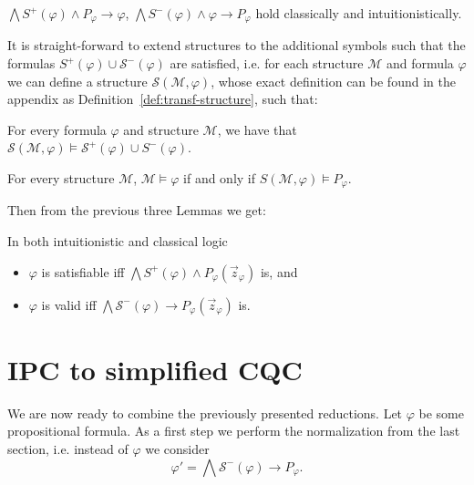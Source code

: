 \documentclass[a4paper,UKenglish,cleveref, autoref, thm-restate]{lipics-v2021}
\begin{document}
\begin{lemma}
	$\bigwedge S^+(\varphi)\wedge P_\varphi\to\varphi$, $\bigwedge S^-(\varphi)\wedge \varphi\to P_\varphi$ hold classically and intuitionistically.
\end{lemma}

It is straight-forward to extend structures to the additional symbols such that the formulas $S^+(\varphi)\cup\mathcal S^-(\varphi)$ are satisfied, i.e. for each structure $\mathcal M$ and formula $\varphi$ we can define a structure $\mathcal S(\mathcal M, \varphi)$, whose exact definition can be found in the appendix as Definition~\ref{def:transf-structure}, such that:
\begin{lemma}
For every formula $\varphi$ and structure $\mathcal M$, we have that	$\mathcal S(\mathcal M, \varphi)\models\mathcal S^+(\varphi)\cup S^-(\varphi)$.
\end{lemma}

\begin{lemma}
	For every structure $\mathcal M$,
	$\mathcal M\models \varphi$ if and only if $S(\mathcal M, \varphi)\models P_\varphi$.
\end{lemma}

Then from the previous three Lemmas we get:

\begin{corollary}\label{equivalid}
	In both intuitionistic and classical logic
	\begin{itemize}
		\item $\varphi$ is satisfiable iff $\mathcal \bigwedge S^+(\varphi)\wedge P_\varphi(\vec z_\varphi)$ is, and
		\item $\varphi$ is valid iff $\bigwedge\mathcal S^-(\varphi)\to P_\varphi(\vec z_\varphi)$ is.
	\end{itemize}
\end{corollary}

\section{IPC to simplified CQC}

We are now ready to combine the previously presented reductions.
Let $\varphi$ be some propositional formula. As a first step we perform the normalization from the last section, i.e. instead of $\varphi$ we consider $$\varphi' = \bigwedge \mathcal S^-(\varphi)\to P_\varphi.$$
\end{document}
